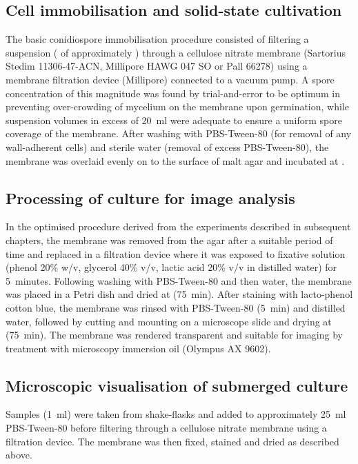 \subsection{Cell immobilisation and solid-state cultivation}

The basic conidiospore immobilisation procedure consisted of filtering a suspension ( of approximately ) through a cellulose nitrate membrane (Sartorius Stedim 11306-47-ACN, Millipore HAWG 047 SO or Pall 66278) using a membrane filtration device (Millipore) connected to a vacuum pump. A spore concentration of this magnitude was found by trial-and-error to be optimum in preventing over-crowding of mycelium on the membrane upon germination, while suspension volumes in excess of 20~ml were adequate to ensure a uniform spore coverage of the membrane. After washing with PBS-Tween-80 (for removal of any wall-adherent cells) and sterile water (removal of excess PBS-Tween-80), the membrane was overlaid evenly on to the surface of malt agar and incubated at .

\subsection{Processing of culture for image analysis}

In the optimised procedure derived from the experiments described in subsequent chapters, the membrane was removed from the agar after a suitable period of time and replaced in a filtration device where it was exposed to fixative solution (phenol 20\% w/v, glycerol 40\% v/v, lactic acid 20\% v/v in distilled water) for 5~minutes. Following washing with PBS-Tween-80 and then water, the membrane was placed in a Petri dish and dried at  (75~min). After staining with lacto-phenol cotton blue, the membrane was rinsed with PBS-Tween-80 (5~min) and distilled water, followed by cutting and mounting on a microscope slide and drying at  (75~min). The membrane was rendered transparent and suitable for imaging by treatment with microscopy immersion oil (Olympus AX 9602).

\subsection{Microscopic visualisation of submerged culture}

Samples (1~ml) were taken from shake-flasks and added to approximately 25~ml PBS-Tween-80 before filtering through a cellulose nitrate membrane using a filtration device. The membrane was then fixed, stained and dried as described above.

